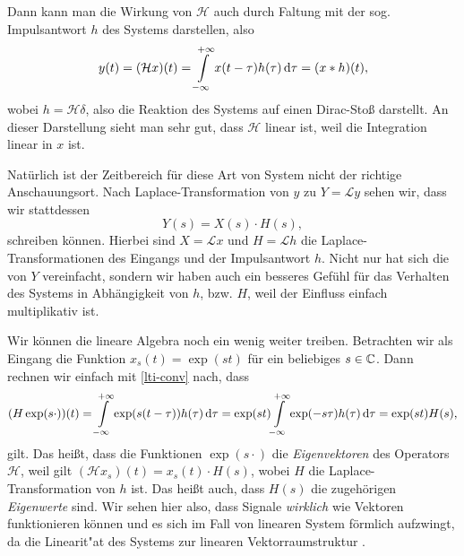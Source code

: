 Dann kann man die Wirkung von $\mathcal{H}$ auch durch Faltung mit der sog. Impulsantwort $h$ des Systems darstellen, also
%
\begin{equation}\label{lti-conv}
    y(t) 
        = (\mathcal{H}x)(t) 
        = {\int\limits_{-\infty}^{+\infty}{x(t - \tau) h(\tau)}\,\mathrm{d}{\tau}} 
        = (x \ast h)(t),
\end{equation}
%
wobei $h = \mathcal{H}\delta$, also die Reaktion des Systems auf einen Dirac-Sto\ss{} darstellt.
An dieser Darstellung sieht man sehr gut, dass $\mathcal{H}$ linear ist, weil die Integration linear in $x$ ist.

Nat\"urlich ist der Zeitbereich f\"ur diese Art von System nicht der richtige Anschauungsort. 
Nach Laplace-Transformation von $y$ zu $Y = \mathcal{L}y$ sehen wir, dass wir stattdessen 
\[
Y(s) = X(s) \cdot H(s),
\]
schreiben k\"onnen. 
Hierbei sind $X = \mathcal{L}x$ und $H = \mathcal{L}h$ die Laplace-Transformationen des Eingangs und der Impulsantwort $h$.
Nicht nur hat sich die  von $Y$ vereinfacht, sondern wir haben auch ein besseres Gef\"uhl f\"ur das Verhalten des Systems in Abh\"angigkeit von $h$, bzw. $H$, weil der Einfluss einfach multiplikativ ist.

Wir k\"onnen die lineare Algebra noch ein wenig weiter treiben. Betrachten wir als Eingang die Funktion $x_s(t) = \exp(s t)$ f\"ur ein beliebiges $s \in \mathbb{C}$.
Dann rechnen wir einfach mit \eqref{lti-conv} nach, dass
\[
(H\exp(s\cdot))(t) 
    = {\int\limits_{-\infty}^{+\infty}{\exp(s (t-\tau))h(\tau)}\,\mathrm{d}{\tau}}
    = \exp(s t) {\int\limits_{-\infty}^{+\infty}{\exp(-s\tau)h(\tau)}\,\mathrm{d}{\tau}}
    = \exp(s t) H(s),
\]
gilt. Das hei\ss{}t, dass die Funktionen $\exp(s \cdot)$ die \emph{Eigenvektoren} des Operators $\mathcal{H}$, weil gilt $(\mathcal{H} x_s)(t) = x_s(t) \cdot H(s)$, wobei $H$ die Laplace-Transformation von $h$ ist.
Das hei\ss{}t auch, dass $H(s)$ die zugeh\"origen \emph{Eigenwerte} sind.
Wir sehen hier also, dass Signale \emph{wirklich} wie Vektoren funktionieren k\"onnen und es sich im Fall von linearen System f\"ormlich aufzwingt, da die Linearit"at des Systems zur linearen Vektorraumstruktur .
